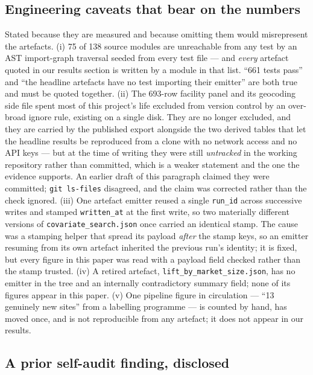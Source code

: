 \documentclass[conference]{IEEEtran}
\begin{document}
\subsection{Engineering caveats that bear on the numbers}

Stated because they are measured and because omitting them would misrepresent
the artefacts. (i) 75 of 138 source modules are unreachable from any test by an
AST import-graph traversal seeded from every test file --- and \emph{every}
artefact quoted in our results section is written by a module in that list.
``661 tests pass'' and ``the headline artefacts have no test importing their
emitter'' are both true and must be quoted together. (ii) The 693-row facility
panel and its geocoding side file spent most of this project's life excluded
from version control by an over-broad ignore rule, existing on a single disk.
They are no longer excluded, and they are carried by the published export
alongside the two derived tables that let the headline results be reproduced
from a clone with no network access and no API keys --- but at the time of
writing they were still \emph{untracked} in the working repository rather than
committed, which is a weaker statement and the one the evidence supports. An
earlier draft of this paragraph claimed they were committed; \texttt{git
ls-files} disagreed, and the claim was corrected rather than the check
ignored. (iii) One artefact emitter reused a
single \texttt{run\_id} across successive writes and stamped
\texttt{written\_at} at the first write, so two materially different versions
of \texttt{covariate\_search.json} once carried an identical stamp. The cause
was a stamping helper that spread its payload \emph{after} the stamp keys, so
an emitter resuming from its own artefact inherited the previous run's
identity; it is fixed, but every figure in this paper was read with a payload
field checked rather than the stamp trusted. (iv) A retired
artefact, \texttt{lift\_by\_market\_size.json}, has no emitter in the tree and
an internally contradictory summary field; none of its figures appear in this
paper. (v) One pipeline figure in circulation --- ``13 genuinely new sites''
from a labelling programme --- is counted by hand, has moved once, and is not
reproducible from any artefact; it does not appear in our results.

\subsection{A prior self-audit finding, disclosed}
\end{document}
